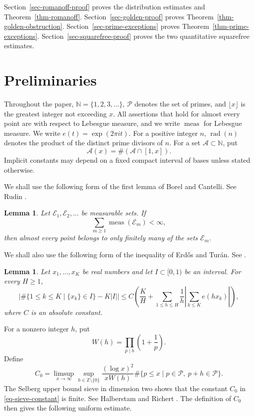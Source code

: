 \documentclass[11pt,reqno]{amsart}
\numberwithin{equation}{section}
\newtheorem{lemma}[theorem]{Lemma}
\begin{document}
    Section~\ref{sec-romanoff-proof} proves the distribution estimates and Theorem~\ref{thm-romanoff}. Section~\ref{sec-golden-proof} proves Theorem~\ref{thm-golden-obstruction}. Section~\ref{sec-prime-exceptions} proves Theorem~\ref{thm-prime-exceptions}. Section~\ref{sec-squarefree-proof} proves the two quantitative squarefree estimates.

    \section{Preliminaries}

    Throughout the paper, $\mathbb{N}=\{1,2,3,\ldots\}$, $\mathcal{P}$ denotes the set of primes, and $\lfloor x\rfloor$ is the greatest integer not exceeding $x$. All assertions that hold for almost every point are with respect to Lebesgue measure, and we write $\operatorname{meas}$ for Lebesgue measure. We write $e(t)=\exp(2\pi i t)$. For a positive integer $n$, $\operatorname{rad}(n)$ denotes the product of the distinct prime divisors of $n$. For a set $\mathcal{A}\subset\mathbb{N}$, put
    $$
    \mathcal{A}(x)=\#(\mathcal{A}\cap[1,x]).
    $$
    Implicit constants may depend on a fixed compact interval of bases unless stated otherwise.

    We shall use the following form of the first lemma of Borel and Cantelli. See Rudin \cite[Theorem 1.41]{Rudin}.

    \begin{lemma}\label{lem-borel-cantelli}
        Let $\mathcal{E}_1,\mathcal{E}_2,\ldots$ be measurable sets. If
        $$
        \sum_{m\ge1}\operatorname{meas}(\mathcal{E}_m)<\infty,
        $$
        then almost every point belongs to only finitely many of the sets $\mathcal{E}_m$.
    \end{lemma}

    We shall also use the following form of the inequality of Erd\H{o}s and Tur\'an. See \cite[Ch. 2, Theorem 2.5]{KuipersNiederreiter}.

    \begin{lemma}\label{lem-erdos-turan}
        Let $x_1,\ldots,x_K$ be real numbers and let $I\subset[0,1)$ be an interval. For every $H\ge1$,
        $$
        \left|\#\bigl\{1\le k\le K\mid \{x_k\}\in I\bigr\}-K|I|\right|
        \le C\left(\frac{K}{H}+\sum_{1\le h\le H}\frac1h\left|\sum_{k\le K}e(hx_k)\right|\right),
        $$
        where $C$ is an absolute constant.
    \end{lemma}

    For a nonzero integer $h$, put
    $$
    W(h)=\prod_{p\mid h}\left(1+\frac1p\right).
    $$
    Define
    \begin{equation}\label{eq-sieve-constant}
        C_0=
        \limsup_{x\to\infty}
        \sup_{h\in\mathbb{Z}\setminus\{0\}}
        \frac{(\log x)^2}{xW(h)}
        \#\{p\le x\mid p\in\mathcal{P},\ p+h\in\mathcal{P}\}.
    \end{equation}
    The Selberg upper bound sieve in dimension two shows that the constant $C_0$ in \eqref{eq-sieve-constant} is finite. See Halberstam and Richert \cite[Ch. 5]{HalberstamRichert}. The definition of $C_0$ then gives the following uniform estimate.
\end{document}
